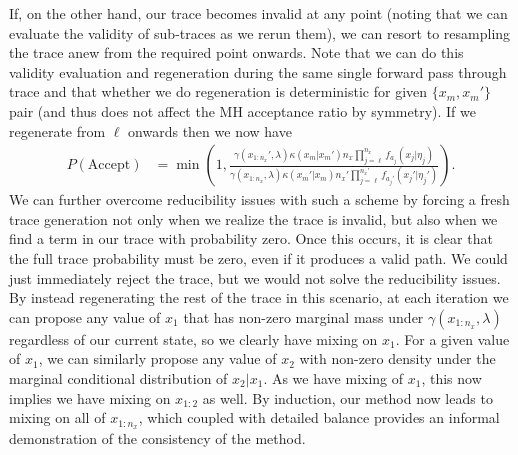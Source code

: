 If, on the other hand, our trace becomes invalid
at any point (noting that we can evaluate the validity of sub-traces as we rerun them), we can resort to
resampling the trace anew from the required point onwards.  Note that we can do this validity evaluation
and regeneration during the same single forward pass through trace and that whether we do regeneration
is deterministic for given $\{x_m,x_m'\}$ pair (and thus does not affect the MH acceptance ratio by symmetry).
If we regenerate from \sample $\ell$ onwards then we now have
\begin{align}
P(\text{Accept}) &= \min\left(1, \frac{\gamma(x_{1:n_x}',\lambda) \kappa(x_m | x_{m}') n_x \prod_{j=\ell}^{n_x} f_{a_{j}} (x_j | \eta_j)}
{\gamma(x_{1:n_x},\lambda) \kappa(x_m' | x_{m})  n_x' \prod_{j=\ell}^{n_x'} f_{a_{j}'} (x_j' | \eta_j')}\right).
\end{align}
We can further overcome reducibility issues with such a scheme by forcing a fresh trace generation
not only when we realize the trace is invalid, but also when we find a term in our trace with probability zero.
Once this occurs, it is clear that the full trace probability must be zero, even if it produces a valid path.  We
could just immediately reject the trace, but we would not solve the reducibility issues.  By instead
regenerating the rest of the trace in this scenario, at each iteration we can propose any value of $x_1$ that has non-zero marginal
mass under $\gamma(x_{1:n_x},\lambda)$ regardless of our current state, so we clearly have mixing on $x_1$.
For a given value of $x_1$, we can similarly propose any value of $x_2$ with non-zero density under the
marginal conditional distribution of $x_2|x_1$.  As we have mixing of $x_1$, this now implies we have
mixing on $x_{1:2}$ as well.  By induction, our method now leads to mixing on all of $x_{1:n_x}$, which
coupled with detailed balance provides an informal demonstration of the consistency of the method.


